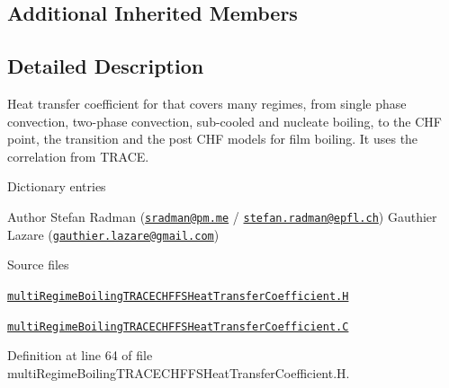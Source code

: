 \subsection*{Additional Inherited Members}


\subsection{Detailed Description}
Heat transfer coefficient for that covers many regimes, from single phase convection, two-\/phase convection, sub-\/cooled and nucleate boiling, to the C\+HF point, the transition and the post C\+HF models for film boiling. It uses the correlation from T\+R\+A\+CE. 

\label{_Description}%
 Dictionary entries

Author Stefan Radman (\href{mailto:sradman@pm.me}{\tt sradman@pm.\+me} / \href{mailto:stefan.radman@epfl.ch}{\tt stefan.\+radman@epfl.\+ch}) Gauthier Lazare (\href{mailto:gauthier.lazare@gmail.com}{\tt gauthier.\+lazare@gmail.\+com})

\begin{DoxyParagraph}{Source files}

\begin{DoxyItemize}
\item \href{../../../home/carlo/data/GeN-Foam/GeN-Foam_ffn/GeN-Foam/GeN-Foam/classes/thermalHydraulics/src/physicsModels/heatTransferModels/FSHeatTransferCoefficientModels/multiRegimeBoilingTRACECHF/multiRegimeBoilingTRACECHFFSHeatTransferCoefficient.H}{\tt multi\+Regime\+Boiling\+T\+R\+A\+C\+E\+C\+H\+F\+F\+S\+Heat\+Transfer\+Coefficient.\+H} 
\item \href{../../../home/carlo/data/GeN-Foam/GeN-Foam_ffn/GeN-Foam/GeN-Foam/classes/thermalHydraulics/src/physicsModels/heatTransferModels/FSHeatTransferCoefficientModels/multiRegimeBoilingTRACECHF/multiRegimeBoilingTRACECHFFSHeatTransferCoefficient.C}{\tt multi\+Regime\+Boiling\+T\+R\+A\+C\+E\+C\+H\+F\+F\+S\+Heat\+Transfer\+Coefficient.\+C} 
\end{DoxyItemize}
\end{DoxyParagraph}


Definition at line 64 of file multi\+Regime\+Boiling\+T\+R\+A\+C\+E\+C\+H\+F\+F\+S\+Heat\+Transfer\+Coefficient.\+H.



